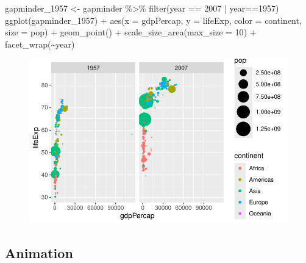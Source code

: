\documentclass[
  letterpaper,
  DIV=11,
  numbers=noendperiod]{scrartcl}
\newenvironment{Shaded}{\begin{snugshade}}{\end{snugshade}}
\newcommand{\AttributeTok}[1]{\textcolor[rgb]{0.40,0.45,0.13}{#1}}
\newcommand{\DecValTok}[1]{\textcolor[rgb]{0.68,0.00,0.00}{#1}}
\newcommand{\FunctionTok}[1]{\textcolor[rgb]{0.28,0.35,0.67}{#1}}
\newcommand{\NormalTok}[1]{\textcolor[rgb]{0.00,0.23,0.31}{#1}}
\newcommand{\OtherTok}[1]{\textcolor[rgb]{0.00,0.23,0.31}{#1}}
\newcommand{\SpecialCharTok}[1]{\textcolor[rgb]{0.37,0.37,0.37}{#1}}
\begin{document}
\begin{Shaded}
\begin{Highlighting}[]
\NormalTok{gapminder\_1957 }\OtherTok{\textless{}{-}}\NormalTok{ gapminder }\SpecialCharTok{\%\textgreater{}\%} \FunctionTok{filter}\NormalTok{(year }\SpecialCharTok{==} \DecValTok{2007} \SpecialCharTok{|}\NormalTok{ year}\SpecialCharTok{==}\DecValTok{1957}\NormalTok{)}
\FunctionTok{ggplot}\NormalTok{(gapminder\_1957) }\SpecialCharTok{+}
  \FunctionTok{aes}\NormalTok{(}\AttributeTok{x =}\NormalTok{ gdpPercap, }\AttributeTok{y =}\NormalTok{ lifeExp, }\AttributeTok{color =}\NormalTok{ continent, }\AttributeTok{size =}\NormalTok{ pop) }\SpecialCharTok{+}
  \FunctionTok{geom\_point}\NormalTok{() }\SpecialCharTok{+} 
  \FunctionTok{scale\_size\_area}\NormalTok{(}\AttributeTok{max\_size =} \DecValTok{10}\NormalTok{) }\SpecialCharTok{+}
  \FunctionTok{facet\_wrap}\NormalTok{(}\SpecialCharTok{\textasciitilde{}}\NormalTok{year)}
\end{Highlighting}
\end{Shaded}

\begin{figure}[H]

{\centering \includegraphics{class05_files/figure-pdf/unnamed-chunk-23-1.pdf}

}

\end{figure}

\hypertarget{animation}{%
\subsection{Animation}\label{animation}}
\end{document}
